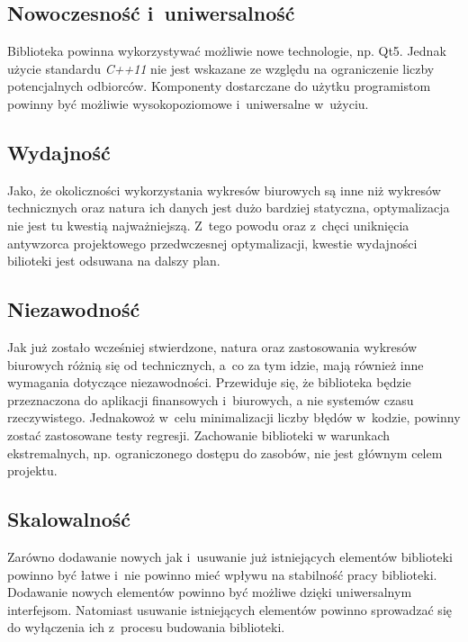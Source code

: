\subsection{Nowoczesność i~uniwersalność}
Biblioteka powinna wykorzystywać możliwie nowe technologie, np. Qt5. Jednak użycie standardu \textit{C++11} nie jest wskazane ze względu na ograniczenie liczby potencjalnych odbiorców. Komponenty dostarczane do użytku programistom powinny być możliwie wysokopoziomowe i~uniwersalne w~użyciu.

\subsection{Wydajność}
Jako, że okoliczności wykorzystania wykresów biurowych są inne niż wykresów technicznych oraz natura ich danych jest dużo bardziej statyczna, optymalizacja nie jest tu kwestią najważniejszą. 
Z~tego powodu oraz z~chęci uniknięcia antywzorca projektowego przedwczesnej optymalizacji, kwestie wydajności bilioteki jest odsuwana na dalszy plan.

\subsection{Niezawodność}
Jak już zostało wcześniej stwierdzone, natura oraz zastosowania wykresów biurowych różnią się od technicznych, a~co za tym idzie, mają również inne wymagania dotyczące niezawodności. Przewiduje się, że biblioteka będzie przeznaczona do aplikacji finansowych i~biurowych, a nie systemów czasu rzeczywistego. Jednakowoż w~celu minimalizacji liczby błędów w~kodzie, powinny zostać zastosowane testy regresji. Zachowanie biblioteki w warunkach ekstremalnych, np. ograniczonego dostępu do zasobów, nie jest głównym celem projektu.


\subsection{Skalowalność}
Zarówno dodawanie nowych jak i~usuwanie już istniejących elementów biblioteki powinno być łatwe i~nie powinno mieć wpływu na stabilność pracy biblioteki. Dodawanie nowych elementów powinno być możliwe dzięki uniwersalnym interfejsom. Natomiast usuwanie istniejących elementów powinno sprowadzać się do wyłączenia ich z~procesu budowania biblioteki.
